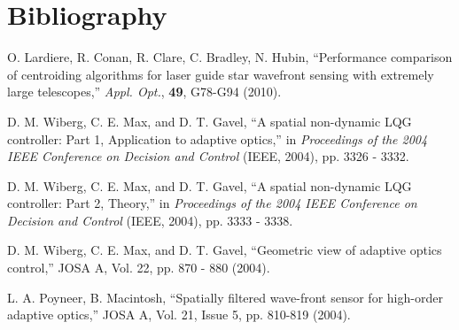 
\newpage
\section{Bibliography}
\label{sec:biblio}

\begin{thebibliography}{}

O. Lardiere, R. Conan, R. Clare, C. Bradley, N. Hubin,
``Performance comparison of centroiding algorithms for laser guide star
wavefront sensing with extremely large telescopes,'' \emph{Appl. Opt.},
\textbf{49}, G78-G94 (2010).

D. M. Wiberg, C. E. Max, and D. T. Gavel, ``A spatial
non-dynamic LQG controller: Part 1, Application to
adaptive optics,'' in \emph{Proceedings of the 2004 IEEE
Conference on Decision and Control} (IEEE, 2004), pp.
3326 - 3332.

D. M. Wiberg, C. E. Max, and D. T. Gavel, ``A spatial
non-dynamic LQG controller: Part 2, Theory,'' in
\emph{Proceedings of the 2004 IEEE Conference on Decision and
Control} (IEEE, 2004), pp. 3333 - 3338.

D. M. Wiberg, C. E. Max, and D. T. Gavel, ``Geometric view of adaptive optics
control,'' JOSA A, Vol. 22, pp. 870 - 880 (2004).

L. A. Poyneer, B. Macintosh,
``Spatially filtered wave-front sensor for high-order adaptive optics,''
JOSA A, Vol. 21, Issue 5, pp. 810-819 (2004).

\end{thebibliography}
